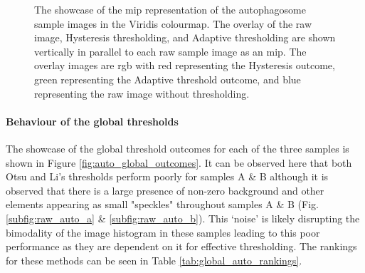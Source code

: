 \begin{figure}
    \centering
    \caption[Showcase of the MIP of the raw autophagosome sample images with the threshold overlay images vertically in parallel]{The showcase of the \gls{mip} representation of the autophagosome sample images in the Viridis colourmap. The overlay of the raw image, Hysteresis thresholding, and Adaptive thresholding are shown vertically in parallel to each raw sample image as an \gls{mip}. The overlay images are \gls{rgb} with red representing the Hysteresis outcome, green representing the Adaptive threshold outcome, and blue representing the raw image without thresholding.}
    \label{fig:raw_image_overlays_auto}
\end{figure}
\paragraph{Behaviour of the global thresholds}
The showcase of the global threshold outcomes for each of the three samples is shown in Figure \ref{fig:auto_global_outcomes}. It can be observed here that both Otsu and Li's thresholds perform poorly for samples A \& B although it is observed that there is a large presence of non-zero background and other elements appearing as small "speckles" throughout samples A \& B (Fig. \ref{subfig:raw_auto_a} \& \ref{subfig:raw_auto_b}). This `noise' is likely disrupting the bimodality of the image histogram in these samples leading to this poor performance as they are dependent on it for effective thresholding. The rankings for these methods can be seen in Table \ref{tab:global_auto_rankings}.

